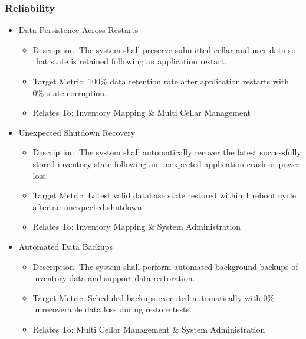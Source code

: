 \documentclass[conference]{IEEEtran}
\begin{document}
\subsubsection{Reliability}
\begin{itemize}
    \item Data Persistence Across Restarts
    \begin{itemize}
        \item Description: The system shall preserve submitted cellar and user data so that state is retained following an application restart.
        \item Target Metric: 100\% data retention rate after application restarts with 0\% state corruption.
        \item Relates To: Inventory Mapping \& Multi Cellar Management
    \end{itemize}

    \item Unexpected Shutdown Recovery
    \begin{itemize}
        \item Description: The system shall automatically recover the latest successfully stored inventory state following an unexpected application crash or power loss.
        \item Target Metric: Latest valid database state restored within 1 reboot cycle after an unexpected shutdown.
        \item Relates To: Inventory Mapping \& System Administration
    \end{itemize}

    \item Automated Data Backups
    \begin{itemize}
        \item Description: The system shall perform automated background backups of inventory data and support data restoration.
        \item Target Metric: Scheduled backups executed automatically with 0\% unrecoverable data loss during restore tests.
        \item Relates To: Multi Cellar Management \& System Administration
    \end{itemize}
\end{itemize}
\end{document}
